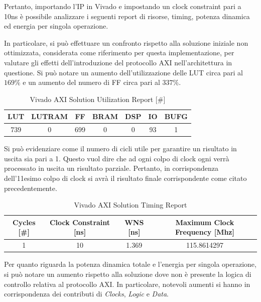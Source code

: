 Pertanto, importando l'IP in Vivado e impostando un clock constraint pari a 10ns è possibile analizzare i seguenti report di risorse, timing, potenza dinamica ed energia per singola operazione.


In particolare, si può effettuare un confronto rispetto alla soluzione iniziale non ottimizzata, considerata come riferimento per questa implementazione, per valutare gli effetti dell'introduzione del protocollo AXI nell'architettura in questione. Si può notare un aumento dell'utilizzazione delle LUT circa pari al $169\%$ e un aumento del numero di FF circa pari al $337\%$. 
\begin{table}[H]
	\centering
	\begin{tabular}{|c|c|c|c|c|c|c|}
		\hline
		\textbf{LUT} & \textbf{LUTRAM} & \textbf{FF} & \textbf{BRAM} & \textbf{DSP} & \textbf{IO} & \textbf{BUFG} \\
		\hline
		739 & 0 & 699 & 0 & 0 & 93 & 1 \\
		\hline
	\end{tabular}
	\caption{Vivado AXI Solution Utilization Report [\#]}
	\label{tab:vivado-axi-solution-utilization-report}
\end{table}

Si può evidenziare come il numero di cicli utile per garantire un risultato in uscita sia pari a 1. Questo vuol dire che ad ogni colpo di clock ogni verrà processato in uscita un risultato parziale. Pertanto, in corrispondenza dell'11esimo colpo di clock si avrà il risultato finale corrispondente come citato precedentemente.

\begin{table}[H]
	\centering
	\begin{tabular}{|c|c|c|c|}
		\hline
		\textbf{Cycles} [\#] & \textbf{Clock Constraint} [ns] & \textbf{WNS} [ns] & \textbf{Maximum Clock Frequency} [Mhz] \\
		\hline
		1 & 10 & 1.369 & 115.8614297 \\
		\hline
	\end{tabular}
	\caption{Vivado AXI Solution Timing Report}
	\label{tab:vivado-axi-solution-timing-report}
\end{table}

Per quanto riguarda la potenza dinamica totale e l'energia per singola operazione, si può notare un aumento rispetto alla soluzione dove non è presente la logica di controllo relativa al protocollo AXI. In particolare, notevoli aumenti si hanno in corrispondenza dei contributi di \textit{Clocks}, \textit{Logic} e \textit{Data}.

